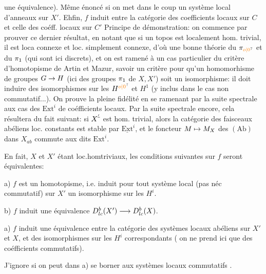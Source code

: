  une équivalence). Même énoncé si on met dans le coup un  système local d'anneaux sur $X'$. Ehfin, $f$ induit   entre la catégorie des coefficients locaux sur $C$ et celle des coéff. locaux sur $C'$  Principe de démonstration: on commence par prouver ce dernier résultat, en notant que  si un topos est localement hom. trivial, il est loca connexe et loc. simplement connexe, d'où une bonne théorie du $\handwritten{\pi}_{\unsure{o|0}}$ et du $\pi_1$ (qui sont ici discrets), et on est ramené  à un cas particulier du critère d'homotopisme de Artin et Mazur, savoir un critère  pour qu'un homomorhisme de groupes $G\to H$ (ici des groupes $\pi_1$ de $X,X'$) soit un isomorphisme: il doit induire des isomorphismes sur les $H^{\unsure{o|0}}$ et $H^1$ (y inclus dans le cas non commutatif...). On prouve la pleine fidélité en se ramenant par la suite spectrale aux cas des $\mathrm{Ext}^i$ de coéfficients locaux. Par la suite spectrale encore, cela résultera du fait suivant: si $X^{\deleted{'}}$ est  hom. trivial, alors la catégorie des faisceaux abéliens loc. constants est stable par $\underline{\mathrm{Ext}}^i$, et le foncteur $M\mapsto M_X$ des  $(\mathrm{Ab})$ dans $X_{ab}$ commute aux dits $\mathrm{Ext}^i$.

En fait, $X$ et $X'$ étant loc.homtriviaux, les conditions suivantes sur $f$ seront équivalentes:

a) $f$ est un homotopisme, i.e. induit pour tout système local (pas néc commutatif) sur $X'$ un isomorphisme sur les $H^i$.

b)  $f$ induit une équivalence $D^b_{lc}(X')\longrightarrow D^b_{lc}(X)$.

a) $f$ induit une équivalence entre la catégorie des systèmes locaux abéliens sur $X'$ et $X$, et des isomorphismes sur les $H^i$ correspondants ( on ne prend ici que des coéfficients commutatifs).

 J'ignore si on peut dans a) se borner aux systèmes locaux commutatifs .

